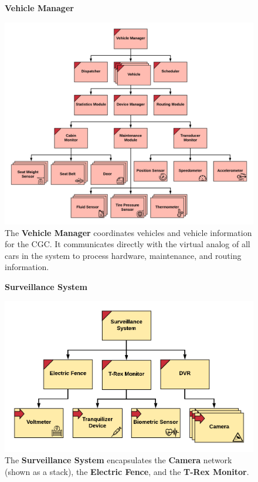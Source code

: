 \documentclass[12pt]{article}
\begin{document}
\begin{figure}[H]
    \centering
    \textbf{Vehicle Manager}\par
    \includegraphics[scale=.23]{Vehicle-Manager.png}
    \caption{The \textbf{Vehicle Manager} coordinates vehicles and vehicle information for the CGC. It communicates 
    directly with the virtual analog of all cars in the system to process hardware, maintenance, and routing information.}
    \label{fig:VehicleManager}
\end{figure}

\begin{figure}[H]
    \centering
    \textbf{Surveillance System}\par
    \includegraphics[scale=.27]{Surveillance-System.png}
    \caption{The \textbf{Surveillance System} encapsulates the \textbf{Camera} network (shown as a stack), the \textbf{Electric Fence}, and the
    \textbf{T-Rex Monitor}.}
    \label{fig:SurveillanceSystem}
\end{figure}
\end{document}
